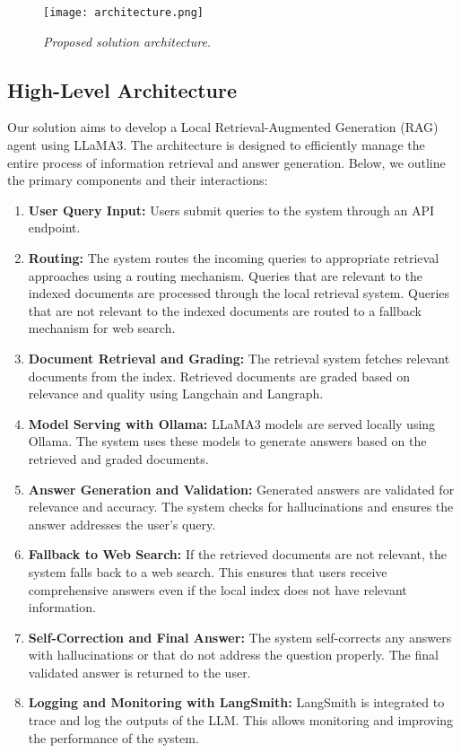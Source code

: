 \begin{figure}[!ht]
    \centering
    \texttt{[image: architecture.png]}
    \caption{\it{Proposed solution architecture.}}
    \label{fig:architecture}
\end{figure}

\subsection{High-Level Architecture}

Our solution aims to develop a Local Retrieval-Augmented Generation (RAG) agent using LLaMA3. The architecture is designed to efficiently manage the entire process of information retrieval and answer generation. Below, we outline the primary components and their interactions:

\begin{enumerate}
    \item \textbf{User Query Input:} Users submit queries to the system through an API endpoint.

    \item \textbf{Routing:} The system routes the incoming queries to appropriate retrieval approaches using a routing mechanism. Queries that are relevant to the indexed documents are processed through the local retrieval system. Queries that are not relevant to the indexed documents are routed to a fallback mechanism for web search.

    \item \textbf{Document Retrieval and Grading:} The retrieval system fetches relevant documents from the index. Retrieved documents are graded based on relevance and quality using Langchain and Langraph.

    \item \textbf{Model Serving with Ollama:} LLaMA3 models are served locally using Ollama. The system uses these models to generate answers based on the retrieved and graded documents.

    \item \textbf{Answer Generation and Validation:} Generated answers are validated for relevance and accuracy. The system checks for hallucinations and ensures the answer addresses the user's query.

    \item \textbf{Fallback to Web Search:} If the retrieved documents are not relevant, the system falls back to a web search. This ensures that users receive comprehensive answers even if the local index does not have relevant information.

    \item \textbf{Self-Correction and Final Answer:} The system self-corrects any answers with hallucinations or that do not address the question properly. The final validated answer is returned to the user.

    \item \textbf{Logging and Monitoring with LangSmith:} LangSmith is integrated to trace and log the outputs of the LLM. This allows monitoring and improving the performance of the system.

\end{enumerate}

